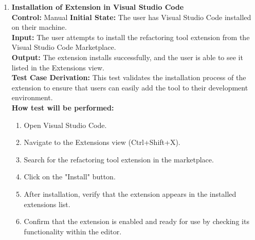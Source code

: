 \documentclass[12pt, titlepage]{article}
\begin{document}
\begin{enumerate}[label={\bf \textcolor{Maroon}{test-FR-IE-\arabic*}}, wide=0pt, font=\itshape]
  \item \textbf{Installation of Extension in Visual Studio Code}\\[2mm]
    \textbf{Control:} Manual
    \textbf{Initial State:} The user has Visual Studio Code installed on their machine.\\
    \textbf{Input:} The user attempts to install the refactoring tool extension from the Visual Studio Code Marketplace.\\
    \textbf{Output:} The extension installs successfully, and the user is able to see it listed in the Extensions view.\\[2mm]
    \textbf{Test Case Derivation:} This test validates the installation process of the extension to ensure that users can easily add the tool to their development environment.\\[2mm]
    \textbf{How test will be performed:} 
    \begin{enumerate}[label=\arabic*.]
        \item Open Visual Studio Code.
        \item Navigate to the Extensions view (Ctrl+Shift+X).
        \item Search for the refactoring tool extension in the marketplace.
        \item Click on the "Install" button.
        \item After installation, verify that the extension appears in the installed extensions list.
        \item Confirm that the extension is enabled and ready for use by checking its functionality within the editor.
    \end{enumerate}


\end{enumerate}
\end{document}
